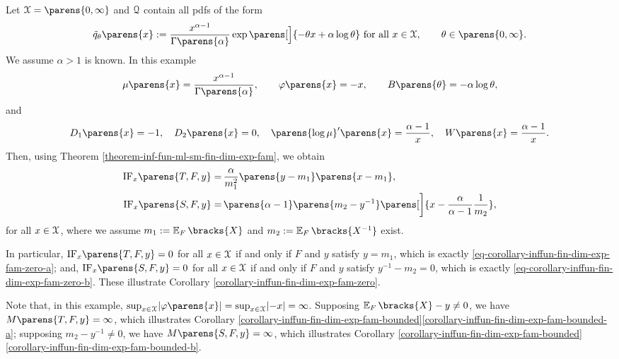 \begin{example}[name=Gamma rate model]
	Let $\calX = \parens{0, \infty}$ and $\mathcal{Q}$ contain all pdfs of the form 
	\begin{align*}
		\tilde{q}_{\theta} \parens{x} := \frac{x^{\alpha-1}}{\Gamma \parens{\alpha}} \exp \parens[\Big]{- \theta x + \alpha \log \theta} \text{ for all } x \in \calX, \qquad \theta \in \parens{0, \infty}. 
	\end{align*}
	We assume $\alpha > 1$ is known. In this example 
	\begin{align*}
		\mu \parens{x} = \frac{x^{\alpha-1}}{\Gamma \parens{\alpha}}, \qquad \varphi \parens{x} = - x, \qquad B \parens{\theta} = - \alpha \log \theta, 
	\end{align*}
	and 
	\begin{align*}
		D_1 \parens{x} = -1, \quad D_2 \parens{x} = 0, \quad \parens{\log \mu}' \parens{x} = \frac{\alpha - 1}{x}, \quad W \parens{x} = \frac{\alpha - 1}{x}. 
	\end{align*}
	Then, using Theorem \ref{theorem-inf-fun-ml-sm-fin-dim-exp-fam}, we obtain 
	\begin{align*}
		\mathrm{IF}_x \parens{T, F, y} = & \, \frac{\alpha}{m_1^2} \parens{y - m_1} \parens{x - m_1}, \\ 
		\mathrm{IF}_x \parens{S, F, y} = & \, \parens{\alpha - 1} \parens{m_2 - y^{-1} } \parens[\bigg]{x - \frac{\alpha}{\alpha - 1} \frac{1}{m_2}}, 
	\end{align*}
	for all $x \in \mathcal{X}$, where we assume $m_1 := \E_F \bracks{X}$ and $m_2 := \E_F \bracks{X^{-1}}$ exist. 
	
	In particular, $\mathrm{IF}_x \parens{T, F, y} = 0$ for all $x \in \mathcal{X}$ if and only if $F$ and $y$ satisfy $y = m_1$, which is exactly \eqref{eq-corollary-inffun-fin-dim-exp-fam-zero-a}; and, $\mathrm{IF}_x \parens{S, F, y} = 0$ for all $x \in \mathcal{X}$ if and only if $F$ and $y$ satisfy $y^{-1} - m_2 = 0$, which is exactly \eqref{eq-corollary-inffun-fin-dim-exp-fam-zero-b}. These illustrate Corollary \ref{corollary-inffun-fin-dim-exp-fam-zero}. 
	
	Note that, in this example, $\sup_{x \in \calX} \abs{\varphi \parens{x}} = \sup_{x \in \calX} \abs{-x} = \infty$. Supposing $\E_F \bracks{X} - y \neq 0$, we have $M \parens{T, F, y} = \infty$, which illustrates Corollary \ref{corollary-inffun-fin-dim-exp-fam-bounded}\ref{corollary-inffun-fin-dim-exp-fam-bounded-a}; supposing $m_2 - y^{-1} \neq 0$, we have $M \parens{S, F, y} = \infty$, which illustrates Corollary \ref{corollary-inffun-fin-dim-exp-fam-bounded}\ref{corollary-inffun-fin-dim-exp-fam-bounded-b}. 
\end{example}

